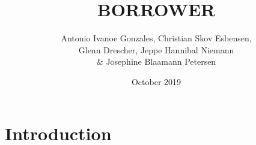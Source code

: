 \documentclass{article}
\title{BORROWER}
\author{Antonio Ivanoe Gonzales, Christian Skov Esbensen,\\
Glenn Drescher, Jeppe Hannibal Niemann \\ \& Josephine Blaamann Petersen}
\date{October 2019}
\begin{document}
\maketitle
\section{Introduction}
\end{document}
